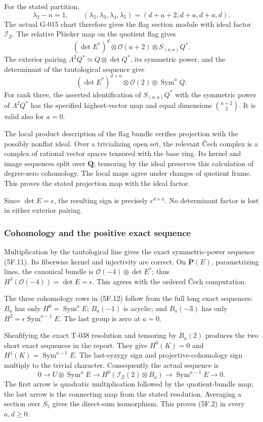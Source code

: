 \documentclass[
  10pt,
]{article}
\begin{document}
For the stated partition, \[
\lambda_2-n=1,\qquad
(\lambda_2,\lambda_3,\lambda_4,\lambda_5)
=(d+a+2,d+a,d+a,d).
\] The actual G-015 chart therefore gives the flag section module with
ideal factor \(\mathcal I_Z\). The relative Plücker map on the quotient
flag gives \[
(\det E^*)^d\otimes\mathcal O(a+2)\otimes S_{(a,a)}Q^*.
\] The exterior pairing \(\Lambda^2Q^*\simeq Q\otimes\det Q^*\), its
symmetric power, and the determinant of the tautological sequence give
\[
(\det E^*)^{d+a}\otimes\mathcal O(2)\otimes\operatorname{Sym}^aQ.
\] For rank three, the asserted identification of \(S_{(a,a)}Q^*\) with
the symmetric power of \(\Lambda^2Q^*\) has the specified highest-vector
map and equal dimensions \(\binom{a+2}{2}\). It is valid also for
\(a=0\).

The local product description of the flag bundle verifies projection
with the possibly nonflat ideal. Over a trivializing open set, the
relevant Čech complex is a complex of rational vector spaces tensored
with the base ring. Its kernel and image sequences split over
\(\mathbf Q\); tensoring by the ideal preserves this calculation of
degree-zero cohomology. The local maps agree under changes of quotient
frame. This proves the stated projection map with the ideal factor.

Since \(\det E=\epsilon\), the resulting sign is precisely
\(\epsilon^{d+a}\). No determinant factor is lost in either exterior
pairing.

\subsubsection{Cohomology and the positive exact
sequence}\label{cohomology-and-the-positive-exact-sequence}

Multiplication by the tautological line gives the exact symmetric-power
sequence (5F.11). Its fiberwise kernel and injectivity are correct. On
\(\mathbf P(E)\), parametrizing lines, the canonical bundle is
\(\mathcal O(-4)\otimes\det E^*\); thus
\(H^3(\mathcal O(-4))=\det E=\epsilon\). This agrees with the ordered
Čech computation.

The three cohomology rows in (5F.12) follow from the full long exact
sequences: \(B_a\) has only \(H^0=\operatorname{Sym}^aE\); \(B_a(-1)\)
is acyclic; and \(B_a(-3)\) has only
\(H^2=\epsilon\operatorname{Sym}^{a-1}E\). The last group is zero at
\(a=0\).

Sheafifying the exact T-038 resolution and tensoring by \(B_a(2)\)
produces the two short exact sequences in the report. They give
\(H^0(K)=0\) and \(H^1(K)=\operatorname{Sym}^{a-1}E\). The last-syzygy
sign and projective-cohomology sign multiply to the trivial character.
Consequently the actual sequence is \[
0\longrightarrow U\otimes\operatorname{Sym}^aE
\longrightarrow H^0(\mathcal I_Z(2)\otimes B_a)
\longrightarrow\operatorname{Sym}^{a-1}E\longrightarrow0.
\] The first arrow is quadratic multiplication followed by the
quotient-bundle map; the last arrow is the connecting map from the
stated resolution. Averaging a section over \(S_5\) gives the direct-sum
isomorphism. This proves (5F.2) in every \(a,d\ge0\).
\end{document}
